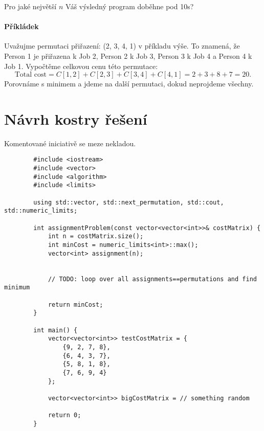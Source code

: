 \documentclass{article}
\begin{document}
	Pro jaké největší $n$ Váš výsledný program doběhne pod 10s?
	
	\paragraph{Příkládek}
	Uvažujme permutaci přiřazení: (2, 3, 4, 1) v příkladu výše.
	To znamená, že Person 1 je přiřazena k Job 2, Person 2 k Job 3, Person 3 k Job 4 a Person 4 k Job 1.
	Vypočtěme celkovou cenu této permutace:
	\[
	\text{Total cost} = C[1, 2] + C[2, 3] + C[3, 4] + C[4, 1] = 2 + 3 + 8 + 7 = 20.
	\]
	Porovnáme s minimem a jdeme na další permutaci, dokud neprojdeme všechny.
	

	\newpage
	
	\section{Návrh kostry řešení}
	
	Komentované iniciativě se meze nekladou.
	
	\begin{lstlisting}
		#include <iostream>
		#include <vector>
		#include <algorithm>
		#include <limits>
		
		using std::vector, std::next_permutation, std::cout, std::numeric_limits;
		
		int assignmentProblem(const vector<vector<int>>& costMatrix) {
			int n = costMatrix.size();
			int minCost = numeric_limits<int>::max();
			vector<int> assignment(n);
			
			
			// TODO: loop over all assignments==permutations and find minimum
			
			return minCost;
		}
		
		int main() {
			vector<vector<int>> testCostMatrix = {
				{9, 2, 7, 8},
				{6, 4, 3, 7},
				{5, 8, 1, 8},
				{7, 6, 9, 4}
			};
			
			vector<vector<int>> bigCostMatrix = // something random
			
			return 0;
		}
	\end{lstlisting}
	
\end{document}
